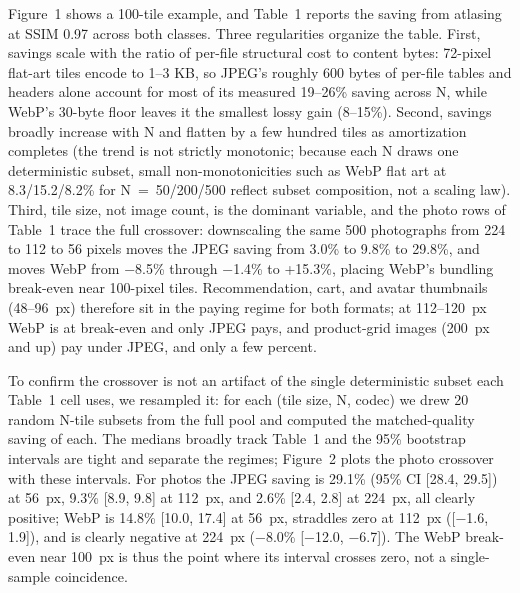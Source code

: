 \documentclass[3p,twocolumn]{elsarticle}
\begin{document}
Figure~1 shows a 100-tile example, and Table~1 reports the saving from
atlasing at SSIM 0.97 across both classes. Three regularities organize
the table. First, savings scale with the ratio of per-file structural
cost to content bytes: 72-pixel flat-art tiles encode to 1--3 KB, so
JPEG's roughly 600 bytes of per-file tables and headers
alone account for most of its measured 19--26\% saving across N, while
WebP's 30-byte floor leaves it the smallest lossy gain
(8--15\%). Second, savings broadly increase with N and flatten by a few
hundred tiles as amortization completes (the trend is not strictly
monotonic; because each N draws one deterministic subset, small
non-monotonicities such as WebP flat art at 8.3/15.2/8.2\% for
N~=~50/200/500 reflect subset composition, not a scaling law). Third,
tile size, not image count, is the dominant variable, and the photo rows
of Table~1 trace the full crossover: downscaling the same 500
photographs from 224 to 112 to 56 pixels moves the JPEG saving from
3.0\% to 9.8\% to 29.8\%, and moves WebP from −8.5\% through −1.4\% to
+15.3\%, placing WebP's bundling break-even near
100-pixel tiles. Recommendation, cart, and avatar thumbnails (48--96~px)
therefore sit in the paying regime for both formats; at 112--120~px WebP
is at break-even and only JPEG pays, and product-grid images (200~px and
up) pay under JPEG, and only a few percent.

To confirm the crossover is not an artifact of the single deterministic
subset each Table~1 cell uses, we resampled it: for each (tile size, N,
codec) we drew 20 random N-tile subsets from the full pool and computed
the matched-quality saving of each. The medians broadly track Table~1
and the 95\% bootstrap intervals are tight and separate the regimes;
Figure~2 plots the photo crossover with these intervals. For photos the
JPEG saving is 29.1\% (95\% CI [28.4, 29.5]) at 56~px, 9.3\% [8.9,
9.8] at 112~px, and 2.6\% [2.4, 2.8] at 224~px, all clearly
positive; WebP is 14.8\% [10.0, 17.4] at 56~px, straddles zero at
112~px ([−1.6, 1.9]), and is clearly negative at 224~px (−8.0\%
[−12.0, −6.7]). The WebP break-even near 100~px is thus the point
where its interval crosses zero, not a single-sample coincidence.
\end{document}

